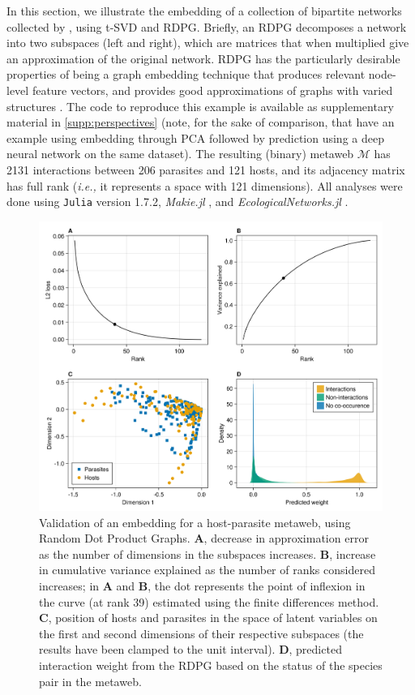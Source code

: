 In this section, we illustrate the embedding of a collection of
bipartite networks collected by \cite{Hadfield2014Tale}, using t-SVD and RDPG.
Briefly, an RDPG decomposes a network into two subspaces (left and
right), which are matrices that when multiplied give an approximation of
the original network. RDPG has the particularly desirable properties of
being a graph embedding technique that produces relevant node-level
feature vectors, and provides good approximations of graphs with varied
structures \cite{Athreya2017Statistical}. The code to reproduce this
example is available as supplementary material in \autoref{supp:perspectives} (note, for the sake of
comparison, that \cite{Strydom2021Roadmap} have an example using embedding
through PCA followed by prediction using a deep neural network on the
same dataset). The resulting (binary) metaweb \(\mathcal{M}\) has 2131
interactions between 206 parasites and 121 hosts, and its adjacency
matrix has full rank (\emph{i.e.,} it represents a space with 121
dimensions). All analyses were done using \texttt{Julia} \cite{Bezanson2017Julia}
version 1.7.2, \emph{Makie.jl} \cite{Danisch2021Makie}, and
\emph{EcologicalNetworks.jl} \cite{Poisot2019Ecologicalnetworks}.

\begin{figure}[h]
    \centering
    \includegraphics[width=\textwidth]{figures/illustration-part1.png}
    \caption{Validation of an embedding for a host-parasite metaweb, using
Random Dot Product Graphs. \textbf{A}, decrease in approximation error
as the number of dimensions in the subspaces increases. \textbf{B},
increase in cumulative variance explained as the number of ranks
considered increases; in \textbf{A} and \textbf{B}, the dot represents
the point of inflexion in the curve (at rank 39) estimated using the
finite differences method. \textbf{C}, position of hosts and parasites
in the space of latent variables on the first and second dimensions of
their respective subspaces (the results have been clamped to the unit
interval). \textbf{D}, predicted interaction weight from the RDPG based
on the status of the species pair in the
metaweb.}
    \label{fig:illustration1}
\end{figure}


